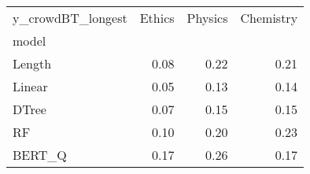 \begin{tabular}{lrrr}
\toprule
y\_crowdBT\_longest &  Ethics &  Physics &  Chemistry \\
model  &         &          &            \\
\midrule
Length &    0.08 &     0.22 &       0.21 \\
Linear &    0.05 &     0.13 &       0.14 \\
DTree  &    0.07 &     0.15 &       0.15 \\
RF     &    0.10 &     0.20 &       0.23 \\
BERT\_Q &    0.17 &     0.26 &       0.17 \\
\bottomrule
\end{tabular}
